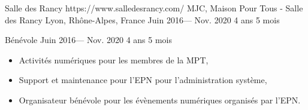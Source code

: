 \volunteerorganization%
{Salle des Rancy}%
{https://www.salledesrancy.com/}
{MJC, Maison Pour Tous - Salle des Rancy}
{Lyon, Rhône-Alpes, France}%
{Juin 2016--- Nov. 2020}
{4 ans 5 mois}

\volunteerposition%
{Bénévole}%
{Juin 2016--- Nov. 2020}%
{4 ans 5 mois}%
{
	\begin{itemize}
	  \item Activités numériques pour les membres de la MPT,
    \item Support et maintenance pour l’EPN pour l’administration système,
    \item Organisateur bénévole pour les évènements numériques organisés par l’EPN.
	\end{itemize}
}
